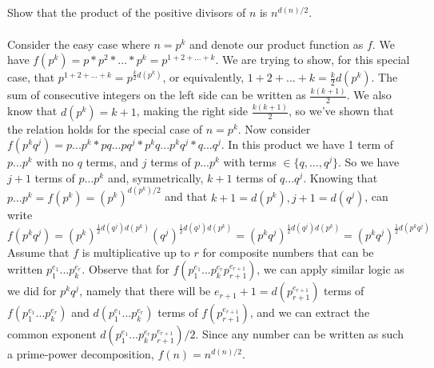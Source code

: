 \documentclass{article}
\begin{document}
\subsection{}
Show that the product of the positive divisors of $n$ is $n^{d(n)/2}$.\\~\\
Consider the easy case where $n = p^k$ and denote our product function as $f$.
We have $f(p^k) = p*p^2*...*p^k = p^{1 + 2 + ... + k}$.
We are trying to show, for this special case, that
$p^{1 + 2 + ... + k} = p^{\frac{k}{2}d(p^k)}$,
or equivalently, $1 + 2 + ... + k = \frac{k}{2}d(p^k)$.
The sum of consecutive integers on the left side can be written as
$\frac{k(k + 1)}{2}$.
We also know that $d(p^k) = k + 1$, making the right side $\frac{k(k + 1)}{2}$,
so we've shown that the relation holds for the special case of $n = p^k$.
Now consider $f(p^kq^j) = p...p^k*pq...pq^j*p^kq...p^kq^j*q...q^j$.
In this product we have 1 term of $p...p^k$ with no $q$ terms,
and $j$ terms of $p...p^k$ with terms $\in \{q, ..., q^j\}$.
So we have $j + 1$ terms of $p...p^k$ and, symmetrically,
$k + 1$ terms of $q...q^j$.
Knowing that $p...p^k = f(p^k) = (p^k)^{d(p^k)/2}$ and that
$k + 1 = d(p^k), j + 1 = d(q^j)$, can write
$f(p^kq^j) = (p^k)^{\frac{1}{2}d(q^j)d(p^k)}(q^j)^{\frac{1}{2}d(q^j)d(p^k)}
= (p^kq^j)^{\frac{1}{2}d(q^j)d(p^k)} = (p^kq^j)^{\frac{1}{2}d(p^kq^j)}$
Assume that $f$ is multiplicative up to $r$ for composite numbers
that can be written $p_1^{e_1}...p_k^{e_r}$.
Observe that for $f(p_1^{e_1}...p_k^{e_r}p_{r+1}^{e_{r+1}})$,
we can apply similar logic as we did for $p^kq^j$,
namely that there will be $e_{r+1} + 1 = d(p_{r+1}^{e_{r+1}})$
terms of $f(p_1^{e_1}...p_k^{e_r})$ and $d(p_1^{e_1}...p_k^{e_r})$
terms of $f(p_{r+1}^{e_{r+1}})$, and we can extract the common exponent
$d(p_1^{e_1}...p_k^{e_r}p_{r+1}^{e_{r+1}})/2$.
Since any number can be written as such a prime-power decomposition,
$f(n) = n^{d(n)/2}$.
\end{document}
